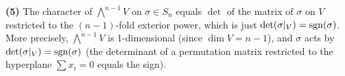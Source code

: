 \documentclass{report}
\begin{document}
\begin{solution}
\textbf{(5)} The character of \(\bigwedge^{n-1} V\) on \(\sigma \in S_n\) equals \(\det\) of the matrix of \(\sigma\) on \(V\) restricted to the \((n-1)\)-fold exterior power, which is just \(\det(\sigma|_V) = \operatorname{sgn}(\sigma)\). More precisely, \(\bigwedge^{n-1} V\) is 1-dimensional (since \(\dim V = n-1\)), and \(\sigma\) acts by \(\det(\sigma|_V) = \operatorname{sgn}(\sigma)\) (the determinant of a permutation matrix restricted to the hyperplane \(\sum x_i = 0\) equals the sign).
\end{solution}
\end{document}
